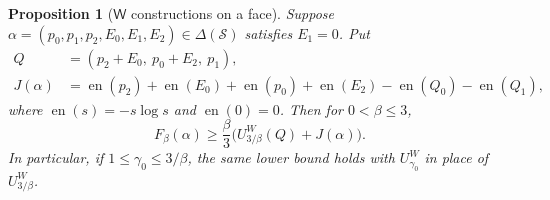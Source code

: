 \documentclass[11pt]{article}
\numberwithin{equation}{section}
\newtheorem{proposition}[theorem]{Proposition}
\theoremstyle{definition}
\theoremstyle{remark}
\DeclareMathOperator{\en}{en}
\begin{document}
\begin{proposition}[$\mathsf W$ constructions on a face]
\label{prop:face}
Suppose $\alpha=(p_0,p_1,p_2,E_0,E_1,E_2)\in\Delta(\mathcal S)$ satisfies
$E_1=0$.  Put
\begin{align}
 Q&=(p_2+E_0,\ p_0+E_2,\ p_1),\label{val:face-Q}\\
 J(\alpha)&=\en(p_2)+\en(E_0)+\en(p_0)+\en(E_2)
                  -\en(Q_0)-\en(Q_1),\label{val:face-J}
\end{align}
where $\en(s)=-s\log s$ and $\en(0)=0$.  Then for $0<\beta\le3$,
\begin{equation}
 F_\beta(\alpha)\ge
 \frac\beta3\bigl(U^W_{3/\beta}(Q)+J(\alpha)\bigr).
\label{val:face-bound}
\end{equation}
In particular, if $1\le\gamma_0\le3/\beta$, the same lower bound holds
with $U^W_{\gamma_0}$ in place of $U^W_{3/\beta}$.
\end{proposition}
\end{document}
